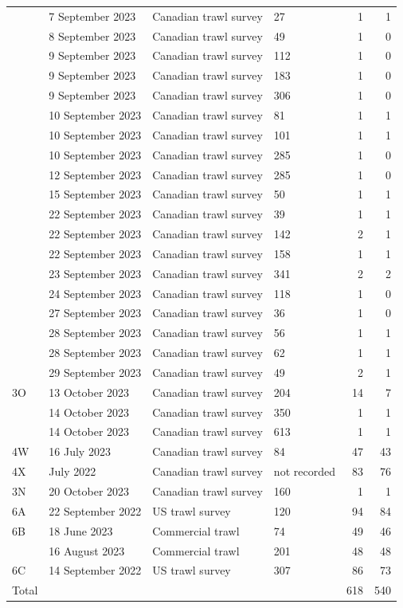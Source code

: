 \begin{longtable}{llllrr}
 & 7 September 2023 & Canadian trawl survey & 27 & 1 & 1 \\
 & 8 September 2023 & Canadian trawl survey & 49 & 1 & 0 \\
 & 9 September 2023 & Canadian trawl survey & 112 & 1 & 0 \\
 & 9 September 2023 & Canadian trawl survey & 183 & 1 & 0 \\
 & 9 September 2023 & Canadian trawl survey & 306 & 1 & 0 \\
 & 10 September 2023 & Canadian trawl survey & 81 & 1 & 1 \\
 & 10 September 2023 & Canadian trawl survey & 101 & 1 & 1 \\
 & 10 September 2023 & Canadian trawl survey & 285 & 1 & 0 \\
 & 12 September 2023 & Canadian trawl survey & 285 & 1 & 0 \\
 & 15 September 2023 & Canadian trawl survey & 50 & 1 & 1 \\
 & 22 September 2023 & Canadian trawl survey & 39 & 1 & 1 \\
 & 22 September 2023 & Canadian trawl survey & 142 & 2 & 1 \\
 & 22 September 2023 & Canadian trawl survey & 158 & 1 & 1 \\
 & 23 September 2023 & Canadian trawl survey & 341 & 2 & 2 \\
 & 24 September 2023 & Canadian trawl survey & 118 & 1 & 0 \\
 & 27 September 2023 & Canadian trawl survey & 36 & 1 & 0 \\
 & 28 September 2023 & Canadian trawl survey & 56 & 1 & 1 \\
 & 28 September 2023 & Canadian trawl survey & 62 & 1 & 1 \\
 & 29 September 2023 & Canadian trawl survey & 49 & 2 & 1 \\
3O & 13 October 2023 & Canadian trawl survey & 204 & 14 & 7 \\
 & 14 October 2023 & Canadian trawl survey & 350 & 1 & 1 \\
 & 14 October 2023 & Canadian trawl survey & 613 & 1 & 1 \\
4W & 16 July 2023 & Canadian trawl survey & 84 & 47 & 43 \\
4X & July 2022 & Canadian trawl survey & not recorded & 83 & 76 \\
3N & 20 October 2023 & Canadian trawl survey & 160 & 1 & 1 \\
6A & 22 September 2022 & US trawl survey & 120 & 94 & 84 \\
6B & 18 June 2023 & Commercial trawl & 74 & 49 & 46 \\
 & 16 August 2023 & Commercial trawl & 201 & 48 & 48 \\
6C & 14 September 2022 & US trawl survey & 307 & 86 & 73 \\
\midrule
Total & & & & 618 & 540 \\
\bottomrule
\end{longtable}
